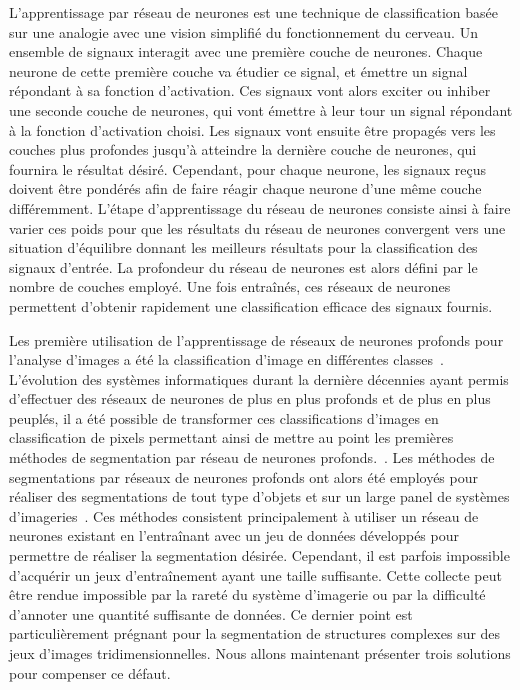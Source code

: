 \documentclass[\main/main.tex]{subfiles}
\begin{document}
%
L'apprentissage par réseau de neurones est une technique de classification basée sur une analogie avec une vision simplifié du fonctionnement du cerveau.
%
Un ensemble de signaux interagit avec une première couche de neurones.
%
Chaque neurone de cette première couche va étudier ce signal, et émettre un signal répondant à sa fonction d'activation.
%
Ces signaux vont alors exciter ou inhiber une seconde couche de neurones, qui vont émettre à leur tour un signal répondant à la fonction d'activation choisi.
%
Les signaux vont ensuite être propagés vers les couches plus profondes jusqu'à atteindre la dernière couche de neurones, qui fournira le résultat désiré.
%
Cependant, pour chaque neurone, les signaux reçus doivent être pondérés afin de faire réagir chaque neurone d'une même couche différemment.
%
L'étape d'apprentissage du réseau de neurones consiste ainsi à faire varier ces poids pour que les résultats du réseau de neurones convergent vers une situation d'équilibre donnant les meilleurs résultats pour la classification des signaux d'entrée.
%
La profondeur du réseau de neurones est alors défini par le nombre de couches employé.
%
Une fois entraînés, ces réseaux de neurones permettent d'obtenir rapidement une classification efficace des signaux fournis.

%
Les première utilisation de l'apprentissage de réseaux de neurones profonds pour l'analyse d'images a été la classification d'image en différentes classes~\cite{lecun_1989,krizhevsky_2012,Simonyan_2014}.
%
L'évolution des systèmes informatiques durant la dernière décennies ayant permis d'effectuer des réseaux de neurones de plus en plus profonds et de plus en plus peuplés, il a été possible de transformer ces classifications d'images en classification de pixels permettant ainsi de mettre au point les premières méthodes de segmentation par réseau de neurones profonds.~\cite{ronneberger_2015,milletari_2016}.
%
Les méthodes de segmentations par réseaux de neurones profonds ont alors été employés pour réaliser des segmentations de tout type d'objets et sur un large panel de systèmes d'imageries~\cite{zhao_2019,xie_2020,xu_2020,zhang_2020,khan_2020,zhang_2019a}.
%
Ces méthodes consistent principalement à utiliser un réseau de neurones existant
en l'entraînant avec un jeu de données développés pour permettre de réaliser la segmentation désirée.
%
Cependant, il est parfois impossible d'acquérir un jeux d'entraînement ayant une taille suffisante.
%
Cette collecte peut être rendue impossible par la rareté du système d'imagerie ou par la difficulté d'annoter une quantité suffisante de données.
%
Ce dernier point est particulièrement prégnant pour la segmentation de structures complexes sur des jeux d'images tridimensionnelles.
%
Nous allons maintenant présenter trois solutions pour compenser ce défaut.
\end{document}
